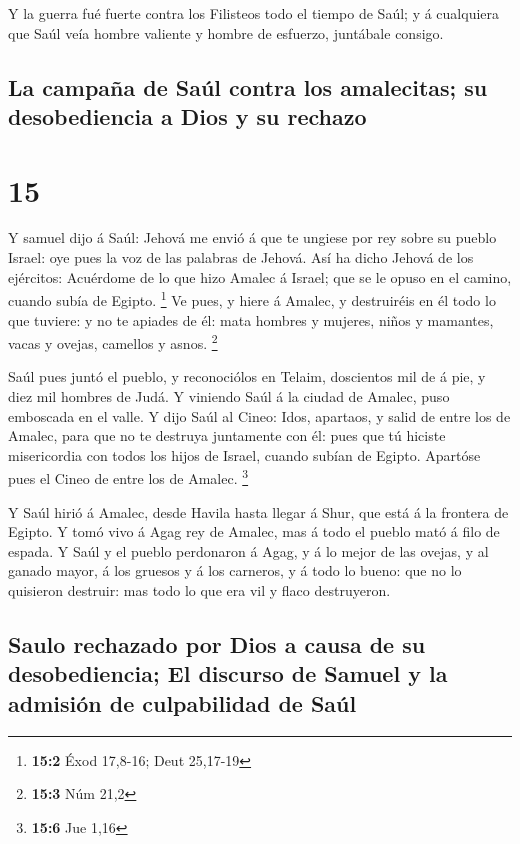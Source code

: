  Y la guerra fué fuerte contra los Filisteos todo el tiempo
de Saúl; y á cualquiera que Saúl veía hombre valiente y hombre de
esfuerzo, juntábale consigo.

\hypertarget{la-campauxf1a-de-sauxfal-contra-los-amalecitas-su-desobediencia-a-dios-y-su-rechazo}{%
\subsection{La campaña de Saúl contra los amalecitas; su desobediencia a
Dios y su
rechazo}\label{la-campauxf1a-de-sauxfal-contra-los-amalecitas-su-desobediencia-a-dios-y-su-rechazo}}

\hypertarget{section-14}{%
\section{15}\label{section-14}}

 Y samuel dijo á Saúl: Jehová me envió á que te ungiese por
rey sobre su pueblo Israel: oye pues la voz de las palabras de Jehová.
 Así ha dicho Jehová de los ejércitos: Acuérdome de lo que
hizo Amalec á Israel; que se le opuso en el camino, cuando subía de
Egipto. \footnote{\textbf{15:2} Éxod 17,8-16; Deut 25,17-19}
 Ve pues, y hiere á Amalec, y destruiréis en él todo lo que
tuviere: y no te apiades de él: mata hombres y mujeres, niños y
mamantes, vacas y ovejas, camellos y asnos. \footnote{\textbf{15:3} Núm
  21,2}

 Saúl pues juntó el pueblo, y reconociólos en Telaim,
doscientos mil de á pie, y diez mil hombres de Judá.  Y
viniendo Saúl á la ciudad de Amalec, puso emboscada en el valle.
 Y dijo Saúl al Cineo: Idos, apartaos, y salid de entre los
de Amalec, para que no te destruya juntamente con él: pues que tú
hiciste misericordia con todos los hijos de Israel, cuando subían de
Egipto. Apartóse pues el Cineo de entre los de Amalec. \footnote{\textbf{15:6}
  Jue 1,16}

 Y Saúl hirió á Amalec, desde Havila hasta llegar á Shur,
que está á la frontera de Egipto.  Y tomó vivo á Agag rey de
Amalec, mas á todo el pueblo mató á filo de espada.  Y Saúl
y el pueblo perdonaron á Agag, y á lo mejor de las ovejas, y al ganado
mayor, á los gruesos y á los carneros, y á todo lo bueno: que no lo
quisieron destruir: mas todo lo que era vil y flaco destruyeron.

\hypertarget{saulo-rechazado-por-dios-a-causa-de-su-desobediencia-el-discurso-de-samuel-y-la-admisiuxf3n-de-culpabilidad-de-sauxfal}{%
\subsection{Saulo rechazado por Dios a causa de su desobediencia; El
discurso de Samuel y la admisión de culpabilidad de
Saúl}\label{saulo-rechazado-por-dios-a-causa-de-su-desobediencia-el-discurso-de-samuel-y-la-admisiuxf3n-de-culpabilidad-de-sauxfal}}


